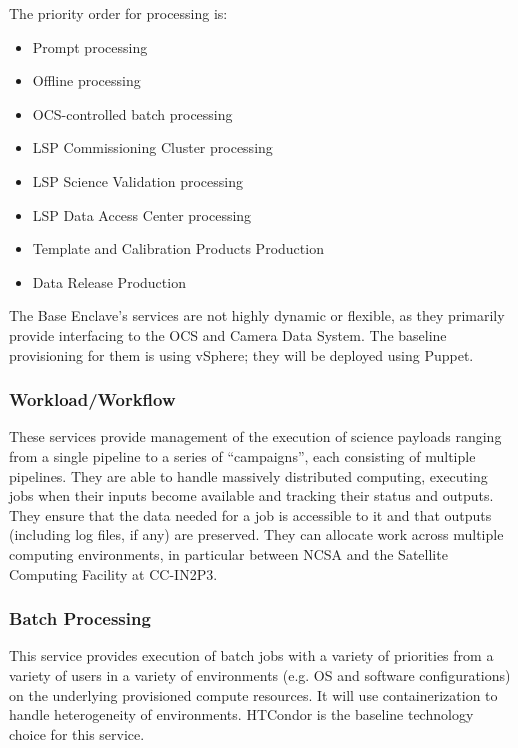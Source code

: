 \documentclass[DM,lsstdraft,toc]{lsstdoc}
\begin{document}
The priority order for processing is:
\begin{itemize}
\item
  Prompt processing
\item
  Offline processing
\item
  OCS-controlled batch processing
\item
  LSP Commissioning Cluster processing
\item
  LSP Science Validation processing
\item
  LSP Data Access Center processing
\item
  Template and Calibration Products Production
\item
  Data Release Production
\end{itemize}

The Base Enclave's services are not highly dynamic or flexible, as they
primarily provide interfacing to the OCS and Camera Data System. The
baseline provisioning for them is using vSphere; they will be deployed
using Puppet.

\subsubsection{Workload/Workflow}\label{workloadworkflow}

These services provide management of the execution of science payloads
ranging from a single pipeline to a series of ``campaigns'', each
consisting of multiple pipelines. They are able to handle massively
distributed computing, executing jobs when their inputs become available
and tracking their status and outputs. They ensure that the data needed
for a job is accessible to it and that outputs (including log files, if
any) are preserved. They can allocate work across multiple computing
environments, in particular between NCSA and the Satellite Computing
Facility at CC-IN2P3.

\subsubsection{Batch Processing}\label{batch-processing}

This service provides execution of batch jobs with a variety of
priorities from a variety of users in a variety of environments (e.g. OS
and software configurations) on the underlying provisioned compute
resources. It will use containerization to handle heterogeneity of
environments. HTCondor is the baseline technology choice for this
service.
\end{document}
